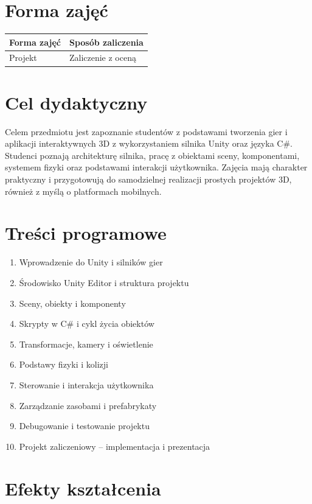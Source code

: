 \documentclass[12pt, a4paper]{article}
\begin{document}
\section{Forma zajęć}

\begin{tabular}{ll}
  \hline
  \textbf{Forma zajęć} & \textbf{Sposób zaliczenia} \\
  \hline
  Projekt & Zaliczenie z oceną \\
  \hline
\end{tabular}

\section{Cel dydaktyczny}

Celem przedmiotu jest zapoznanie studentów z podstawami tworzenia gier i aplikacji interaktywnych 3D z wykorzystaniem silnika Unity oraz języka C\#. Studenci poznają architekturę silnika, pracę z obiektami sceny, komponentami, systemem fizyki oraz podstawami interakcji użytkownika. Zajęcia mają charakter praktyczny i przygotowują do samodzielnej realizacji prostych projektów 3D, również z myślą o platformach mobilnych.

\section{Treści programowe}

\begin{enumerate}
  \item Wprowadzenie do Unity i silników gier
  \item Środowisko Unity Editor i struktura projektu
  \item Sceny, obiekty i komponenty
  \item Skrypty w C\# i cykl życia obiektów
  \item Transformacje, kamery i oświetlenie
  \item Podstawy fizyki i kolizji
  \item Sterowanie i interakcja użytkownika
  \item Zarządzanie zasobami i prefabrykaty
  \item Debugowanie i testowanie projektu
  \item Projekt zaliczeniowy – implementacja i prezentacja
\end{enumerate}

\section{Efekty kształcenia}
\end{document}
